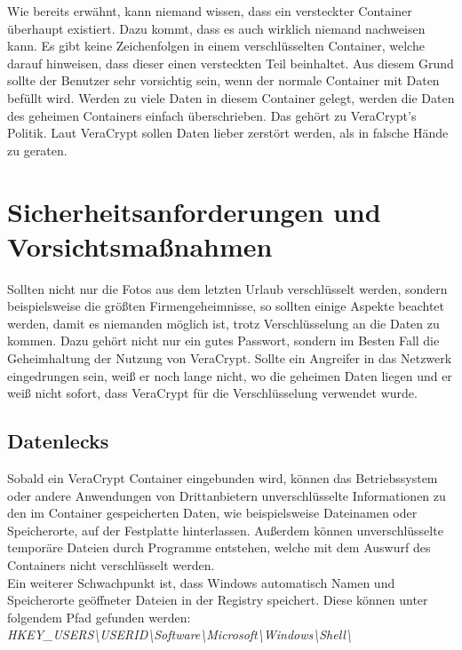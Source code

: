 \documentclass[12pt,a4paper]{scrreprt}
\begin{document}
\noindent Wie bereits erwähnt, kann niemand wissen, dass ein versteckter Container überhaupt existiert. Dazu kommt, dass es auch wirklich niemand nachweisen kann. Es gibt keine Zeichenfolgen in einem verschlüsselten Container, welche darauf hinweisen, dass dieser einen versteckten Teil beinhaltet. Aus diesem Grund sollte der Benutzer sehr vorsichtig sein, wenn der normale Container mit Daten befüllt wird. Werden zu viele Daten in diesem Container gelegt, werden die Daten des geheimen Containers einfach überschrieben. Das gehört zu VeraCrypt's Politik. Laut VeraCrypt sollen Daten lieber zerstört werden, als in falsche Hände zu geraten.

\section{Sicherheitsanforderungen und Vorsichtsmaßnahmen}
Sollten nicht nur die Fotos aus dem letzten Urlaub verschlüsselt werden, sondern beispielsweise die größten Firmengeheimnisse, so sollten einige Aspekte beachtet werden, damit es niemanden möglich ist, trotz Verschlüsselung an die Daten zu kommen. Dazu gehört nicht nur ein gutes Passwort, sondern im Besten Fall die Geheimhaltung der Nutzung von VeraCrypt. Sollte ein Angreifer in das Netzwerk eingedrungen sein, weiß er noch lange nicht, wo die geheimen Daten liegen und er weiß nicht sofort, dass VeraCrypt für die Verschlüsselung verwendet wurde.

\subsection{Datenlecks}
Sobald ein VeraCrypt Container eingebunden wird, können das Betriebssystem oder andere Anwendungen von Drittanbietern unverschlüsselte Informationen zu den im Container gespeicherten Daten, wie beispielsweise Dateinamen oder Speicherorte, auf der Festplatte hinterlassen. Außerdem können unverschlüsselte temporäre Dateien durch Programme entstehen, welche mit dem Auswurf des Containers nicht verschlüsselt werden. \\

\noindent Ein weiterer Schwachpunkt ist, dass Windows automatisch Namen und Speicherorte geöffneter Dateien in der Registry speichert. Diese können unter folgendem Pfad gefunden werden: \\

\textit{HKEY\_{}USERS\textbackslash USERID\textbackslash Software\textbackslash Microsoft\textbackslash Windows\textbackslash Shell\textbackslash} \\
\end{document}
